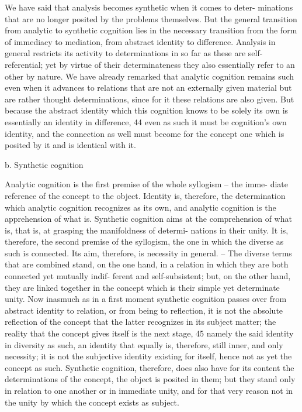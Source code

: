 We have said that analysis becomes synthetic when it comes to deter-
minations that are no longer posited by the problems themselves. But the
general transition from analytic to synthetic cognition lies in the necessary
transition from the form of immediacy to mediation, from abstract identity
to difference. Analysis in general restricts its activity to determinations in
so far as these are self-referential; yet by virtue of their determinateness they
also essentially refer to an other by nature. We have already remarked that
analytic cognition remains such even when it advances to relations that
are not an externally given material but are rather thought determinations,
since for it these relations are also given. But because the abstract identity
which this cognition knows to be solely its own is essentially an identity
in difference, 44 even as such it must be cognition’s own identity, and the
connection as well must become for the concept one which is posited by it
and is identical with it.

b. Synthetic cognition

Analytic cognition is the first premise of the whole syllogism – the imme-
diate reference of the concept to the object. Identity is, therefore, the
determination which analytic cognition recognizes as its own, and analytic
cognition is the apprehension of what is. Synthetic cognition aims at the
comprehension of what is, that is, at grasping the manifoldness of determi-
nations in their unity. It is, therefore, the second premise of the syllogism,
the one in which the diverse as such is connected. Its aim, therefore, is
necessity in general. – The diverse terms that are combined stand, on the
one hand, in a relation in which they are both connected yet mutually indif-
ferent and self-subsistent; but, on the other hand, they are linked together
in the concept which is their simple yet determinate unity. Now inasmuch
as in a first moment synthetic cognition passes over from abstract identity
to relation, or from being to reflection, it is not the absolute reflection
of the concept that the latter recognizes in its subject matter; the reality
that the concept gives itself is the next stage, 45 namely the said identity
in diversity as such, an identity that equally is, therefore, still inner, and
only necessity; it is not the subjective identity existing for itself, hence not
as yet the concept as such. Synthetic cognition, therefore, does also have
for its content the determinations of the concept, the object is posited in
them; but they stand only in relation to one another or in immediate unity,
and for that very reason not in the unity by which the concept exists as
subject.


